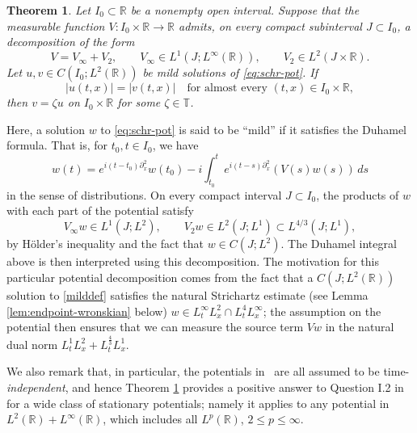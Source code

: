 \documentclass[11pt]{amsart}
\newtheorem{mainresult}{Theorem}
\theoremstyle{remark}
\newcommand{\R}{\mathbb R}
\newcommand{\T}{\mathbb T}
\newcommand{\1}{\mathbf 1}
\begin{document}
\begin{mainresult}
\label{thm:time-potential}
Let $I_0\subset\R$ be a nonempty open interval. Suppose that the measurable
function $V:I_0\times\R\to\R$ admits, on every compact subinterval
$J\subset I_0$, a decomposition of the form
\[
 V=V_\infty+V_2,
 \qquad
 V_\infty\in L^1(J;L^\infty(\R)),
 \qquad
 V_2\in L^2(J\times\R).
\]
Let $u,v\in C(I_0;L^2(\R))$ be mild solutions of \eqref{eq:schr-pot}. If
\[
 |u(t,x)|=|v(t,x)|
 \quad\text{for almost every }(t,x)\in I_0\times\R,
\]
then $v=\zeta u$ on $I_0\times\R$ for some
$\zeta\in\T$.
\end{mainresult}
Here, a solution $w$ to \eqref{eq:schr-pot} is said to be ``mild'' if it satisfies the Duhamel formula. That is, for $t_0,t\in I_0$, we have
\begin{equation}\label{milddef}
 w(t)=e^{i(t-t_0)\partial_x^2}w(t_0)
 -i\int_{t_0}^t e^{i(t-s)\partial_x^2}(V(s)w(s))\,ds
\end{equation}
in the sense of distributions. On every compact interval $J\subset I_0$, the products of $w$ with each part of the potential satisfy
\[
 V_\infty w\in L^1(J;L^2),
 \qquad
 V_2w\in L^2(J;L^1)\subset L^{4/3}(J;L^1),
\]
by H\"older's inequality and the fact that $w\in C(J;L^2)$. The Duhamel integral above is then interpreted using this decomposition. The motivation for this particular potential decomposition comes from the fact that a $C(J;L^2(\mathbb{R}))$ solution to \eqref{milddef} satisfies the natural Strichartz estimate (see Lemma \ref{lem:endpoint-wronskian} below) $w\in L_t^{\infty}L_x^2\cap L_t^4L_x^{\infty}$; the assumption on the potential then ensures that we can measure the source term $Vw$ in the natural dual norm $L_t^1L_x^2+L_t^{\frac{4}{3}}L_x^1$.

We also remark that, in particular, the potentials in~\cite{Jaming2025} are all assumed to be time-\emph{independent}, and hence Theorem \ref{thm:time-potential} provides a positive answer to Question I.2 in~\cite{Jaming2025} for a wide class of stationary potentials; namely it applies to any potential in $L^2(\R)+L^\infty(\R)$, which includes all $L^p(\R)$,
$2\le p\le\infty$.
\end{document}
